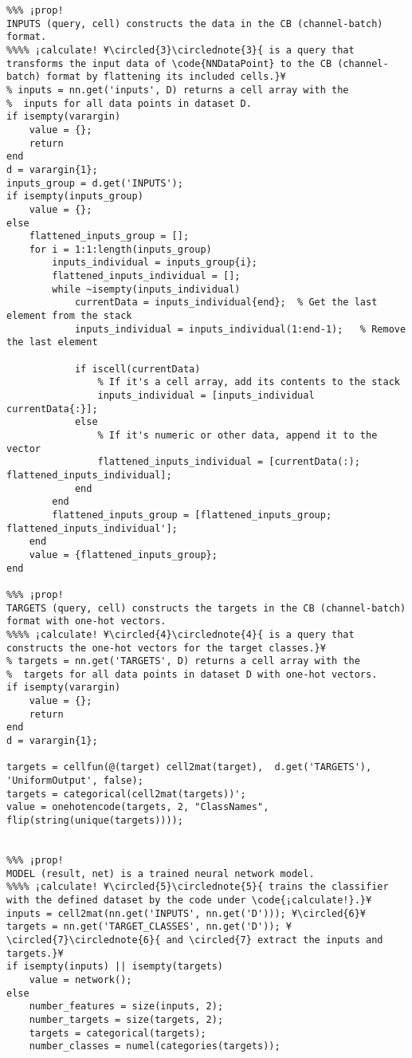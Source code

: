 \documentclass{tufte-handout}
\begin{document}
\begin{lstlisting}
%%% ¡prop!
INPUTS (query, cell) constructs the data in the CB (channel-batch) format.
%%%% ¡calculate! ¥\circled{3}\circlednote{3}{ is a query that transforms the input data of \code{NNDataPoint} to the CB (channel-batch) format by flattening its included cells.}¥
% inputs = nn.get('inputs', D) returns a cell array with the
%  inputs for all data points in dataset D.
if isempty(varargin)
    value = {};
    return
end
d = varargin{1};
inputs_group = d.get('INPUTS');
if isempty(inputs_group)
    value = {};
else
    flattened_inputs_group = [];
    for i = 1:1:length(inputs_group)
        inputs_individual = inputs_group{i};
        flattened_inputs_individual = [];
        while ~isempty(inputs_individual)
            currentData = inputs_individual{end};  % Get the last element from the stack
            inputs_individual = inputs_individual(1:end-1);   % Remove the last element

            if iscell(currentData)
                % If it's a cell array, add its contents to the stack
                inputs_individual = [inputs_individual currentData{:}];
            else
                % If it's numeric or other data, append it to the vector
                flattened_inputs_individual = [currentData(:); flattened_inputs_individual];
            end
        end
        flattened_inputs_group = [flattened_inputs_group; flattened_inputs_individual'];
    end
    value = {flattened_inputs_group};
end

%%% ¡prop!
TARGETS (query, cell) constructs the targets in the CB (channel-batch) format with one-hot vectors.
%%%% ¡calculate! ¥\circled{4}\circlednote{4}{ is a query that constructs the one-hot vectors for the target classes.}¥
% targets = nn.get('TARGETS', D) returns a cell array with the
%  targets for all data points in dataset D with one-hot vectors.
if isempty(varargin)
    value = {};
    return
end
d = varargin{1};

targets = cellfun(@(target) cell2mat(target),  d.get('TARGETS'), 'UniformOutput', false);
targets = categorical(cell2mat(targets))';
value = onehotencode(targets, 2, "ClassNames", flip(string(unique(targets))));


%%% ¡prop!
MODEL (result, net) is a trained neural network model.
%%%% ¡calculate! ¥\circled{5}\circlednote{5}{ trains the classifier with the defined dataset by the code under \code{¡calculate!}.}¥
inputs = cell2mat(nn.get('INPUTS', nn.get('D'))); ¥\circled{6}¥
targets = nn.get('TARGET_CLASSES', nn.get('D')); ¥\circled{7}\circlednote{6}{ and \circled{7} extract the inputs and targets.}¥
if isempty(inputs) || isempty(targets)
    value = network();
else
    number_features = size(inputs, 2);
    number_targets = size(targets, 2);
    targets = categorical(targets); 
    number_classes = numel(categories(targets));
    

\end{lstlisting}
\end{document}
